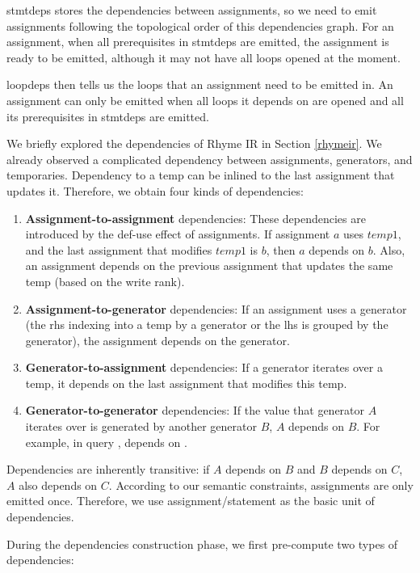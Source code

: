 \documentclass[sigplan, nonacm]{acmart}\settopmatter{printfolios=true,printccs=false,printacmref=false}
\begin{document}
stmtdeps stores the dependencies between assignments, so we need to emit assignments following the topological order of this dependencies graph. For an assignment, when all prerequisites in stmtdeps are emitted, the assignment is ready to be emitted, although it may not have all loops opened at the moment. \par loopdeps then tells us the loops that an assignment need to be emitted in. An assignment can only be emitted when all loops it depends on are opened and all its prerequisites in stmtdeps are emitted.\par
\fi
We briefly explored the dependencies of Rhyme IR in Section \ref{rhymeir}. We already observed a complicated dependency between assignments, generators, and temporaries. Dependency to a temp can be inlined to the last assignment that updates it. Therefore, we obtain four kinds of dependencies:

\begin{enumerate}
\item \textbf{Assignment-to-assignment} dependencies: These dependencies are introduced by the def-use effect of assignments. If assignment $a$ uses $temp1$, and the last assignment that modifies $temp1$ is $b$, then $a$ depends on $b$. Also, an assignment depends on the previous assignment that updates the same temp (based on the write rank).
\item \textbf{Assignment-to-generator} dependencies: If an assignment uses a generator (the rhs indexing into a temp by a generator or the lhs is grouped by the generator), the assignment depends on the generator.
\item \textbf{Generator-to-assignment} dependencies: If a generator iterates over a temp, it depends on the last assignment that modifies this temp.
\item \textbf{Generator-to-generator} dependencies: If the value that generator $A$ iterates over is generated by another generator $B$, $A$ depends on $B$. For example, in query ,  depends on .
\end{enumerate}

Dependencies are inherently transitive: if $A$ depends on $B$ and $B$ depends on $C$, $A$ also depends on $C$. According to our semantic constraints, assignments are only emitted once. Therefore, we use assignment/statement as the basic unit of dependencies.\par

During the dependencies construction phase, we first pre-compute two types of dependencies:
\end{document}
